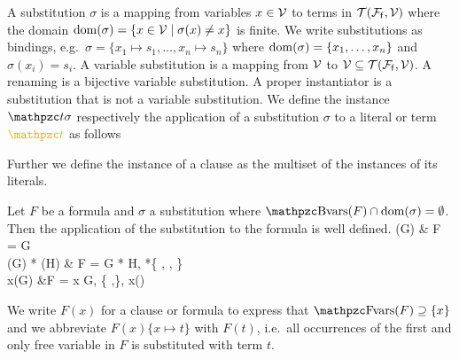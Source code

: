 


\begin{definition}\label{def:substitution}
	A {\myem substitution} $\sigma$ is a mapping from variables $x\in{\mathcal V}$ to terms in ${{\mathcal T}({\mathcal F}_{\mathsf f},{\mathcal V})}$
	where the {\myem domain }$\operatorname{dom}(\sigma) = \{ x\in{\mathcal V}\mid\sigma(x) \neq x \}$ is finite.
	We write substitutions as bindings, e.g.~$\sigma=\{ x_1\mapsto s_1,\ldots,x_n\mapsto s_n \}$
	where $\operatorname{dom}(\sigma)=\{ x_1,\ldots,x_n \}$ and $\sigma(x_i)=s_i$.
	A {\myem variable substitution} is a mapping from ${\mathcal V}$ to ${\mathcal V}\subseteq{{\mathcal T}({\mathcal F}_{\mathsf f},{\mathcal V})}$.
	A {\myem renaming} is a bijective variable substitution.
	A {\myem proper instantiator} is a substitution that is not a variable substitution.
	We define the instance $\mct\sigma$ 
	respectively the application of a substitution $\sigma$ to a literal or term $\foxt$ as follows

\noindent Further we define the instance of a clause as the multiset of the instances of its literals.

\begin{definition}
	Let $F$ be a formula and $\sigma$ a substitution
	where $\bvar(F)\cap\domain(\sigma) = \emptyset$. Then the application of the substitution to the formula is well defined.
{
		\lnot(G\sigma) & F = \lnot G\\
		(G\sigma) * (H\sigma) & F = G * H, *\in \{ \land, \lor, \limp \}\\
		\quantify x(G\sigma) &F = \quantify x G, \quantify\in\{ \forall,\exists \}\colG, x\not\in\domain(\sigma)
	}
\end{definition}



\begin{remark}[\OBSOLETE] 
	We write $F(x)$ for a clause or formula to express that $\fvar(F) \supseteq \{ x \}$
	and we abbreviate $F(x)\{x\mapsto t\}$ with $F(t)$, i.e.~all occurrences 
	of the first and only free variable in $F$ is substituted with term $t$.
\end{remark}


\end{definition}

